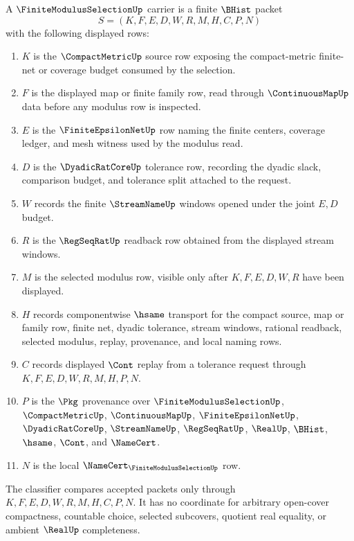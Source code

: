 \begin{definition}
\label{def:finite-modulus-selection-carrier}
A $\FiniteModulusSelectionUp$ carrier is a finite $\BHist$ packet
$$
S=(K,F,E,D,W,R,M,H,C,P,N)
$$
with the following displayed rows:
\begin{enumerate}
\item $K$ is the $\CompactMetricUp$ source row exposing the compact-metric finite-net or coverage budget consumed by the selection.
\item $F$ is the displayed map or finite family row, read through $\ContinuousMapUp$ data before any modulus row is inspected.
\item $E$ is the $\FiniteEpsilonNetUp$ row naming the finite centers, coverage ledger, and mesh witness used by the modulus read.
\item $D$ is the $\DyadicRatCoreUp$ tolerance row, recording the dyadic slack, comparison budget, and tolerance split attached to the request.
\item $W$ records the finite $\StreamNameUp$ windows opened under the joint $E,D$ budget.
\item $R$ is the $\RegSeqRatUp$ readback row obtained from the displayed stream windows.
\item $M$ is the selected modulus row, visible only after $K,F,E,D,W,R$ have been displayed.
\item $H$ records componentwise $\hsame$ transport for the compact source, map or family row, finite net, dyadic tolerance, stream windows, rational readback, selected modulus, replay, provenance, and local naming rows.
\item $C$ records displayed $\Cont$ replay from a tolerance request through $K,F,E,D,W,R,M,H,P,N$.
\item $P$ is the $\Pkg$ provenance over $\FiniteModulusSelectionUp$, $\CompactMetricUp$, $\ContinuousMapUp$, $\FiniteEpsilonNetUp$, $\DyadicRatCoreUp$, $\StreamNameUp$, $\RegSeqRatUp$, $\RealUp$, $\BHist$, $\hsame$, $\Cont$, and $\NameCert$.
\item $N$ is the local $\NameCert_{\FiniteModulusSelectionUp}$ row.
\end{enumerate}
The classifier compares accepted packets only through $K,F,E,D,W,R,M,H,C,P,N$. It has no coordinate for arbitrary open-cover compactness, countable choice, selected subcovers, quotient real equality, or ambient $\RealUp$ completeness.
\end{definition}

